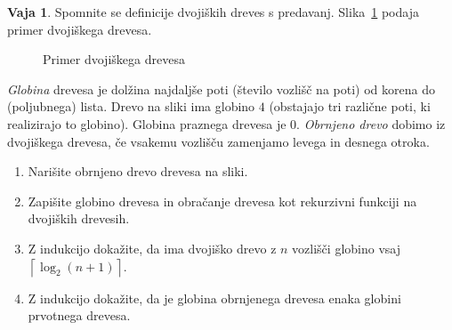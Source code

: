 \documentclass{article}
\theoremstyle{definition}
\newtheorem{vaja}{Vaja}
\begin{document}
\begin{vaja}
	Spomnite se definicije dvojiških dreves s predavanj. Slika~\ref{fig:drevo} podaja primer dvojiškega drevesa.

	\begin{figure}[!ht]
		\centering
		\caption{Primer dvojiškega drevesa}
		\label{fig:drevo}
	\end{figure}

	\emph{Globina} drevesa je dolžina najdaljše poti (število vozlišč na poti) od korena do (poljubnega) lista. Drevo na sliki ima globino $4$ (obstajajo tri različne poti, ki realizirajo to globino). Globina praznega drevesa je 0.  
	\emph{Obrnjeno drevo} dobimo iz dvojiškega drevesa, če vsakemu vozlišču zamenjamo levega in desnega otroka. 
	\begin{enumerate}
		\item Narišite obrnjeno drevo drevesa na sliki.
		\item Zapišite globino drevesa in obračanje drevesa kot rekurzivni funkciji na dvojiških drevesih.
		\item Z indukcijo dokažite, da ima dvojiško drevo z $n$ vozlišči globino vsaj $\left \lceil{ \log_2(n + 1)}\right \rceil $. 
		\item Z indukcijo dokažite, da je globina obrnjenega drevesa enaka globini prvotnega drevesa. 
	\end{enumerate}
\end{vaja}
\end{document}
